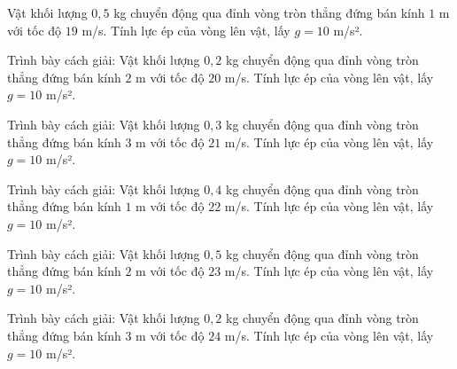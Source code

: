 \begin{ex}
Vật khối lượng $0,5$ kg chuyển động qua đỉnh vòng tròn thẳng đứng bán kính $1$ m với tốc độ $19$ m/s. Tính lực ép của vòng lên vật, lấy $g=10$ m/s².
\end{ex}

\begin{bt}
Trình bày cách giải: Vật khối lượng $0,2$ kg chuyển động qua đỉnh vòng tròn thẳng đứng bán kính $2$ m với tốc độ $20$ m/s. Tính lực ép của vòng lên vật, lấy $g=10$ m/s².
\end{bt}

\begin{bt}
Trình bày cách giải: Vật khối lượng $0,3$ kg chuyển động qua đỉnh vòng tròn thẳng đứng bán kính $3$ m với tốc độ $21$ m/s. Tính lực ép của vòng lên vật, lấy $g=10$ m/s².
\end{bt}

\begin{bt}
Trình bày cách giải: Vật khối lượng $0,4$ kg chuyển động qua đỉnh vòng tròn thẳng đứng bán kính $1$ m với tốc độ $22$ m/s. Tính lực ép của vòng lên vật, lấy $g=10$ m/s².
\end{bt}

\begin{bt}
Trình bày cách giải: Vật khối lượng $0,5$ kg chuyển động qua đỉnh vòng tròn thẳng đứng bán kính $2$ m với tốc độ $23$ m/s. Tính lực ép của vòng lên vật, lấy $g=10$ m/s².
\end{bt}

\begin{bt}
Trình bày cách giải: Vật khối lượng $0,2$ kg chuyển động qua đỉnh vòng tròn thẳng đứng bán kính $3$ m với tốc độ $24$ m/s. Tính lực ép của vòng lên vật, lấy $g=10$ m/s².
\end{bt}


